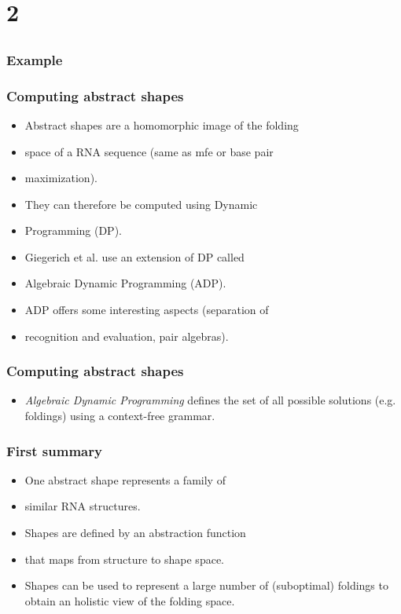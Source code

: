\documentclass[ignorenonframetext,10pt]{beamer}
\begin{document}
\section{2}
\subsection{}
\begin{frame}
\frametitle{Example }
\end{frame}

\begin{frame}
\frametitle{Computing abstract shapes}
   \begin{itemize} 
   \item Abstract shapes are a homomorphic image of the folding
   \item space of a RNA sequence (same as mfe or base pair 
   \item maximization).
   \item They can therefore be computed using Dynamic
   \item Programming (DP).  
   \item Giegerich et al. use an extension of DP called
   \item Algebraic Dynamic Programming (ADP).
   \item ADP offers some interesting aspects (separation of
   \item recognition and evaluation, pair algebras).
   \end{itemize}
\end{frame}

\begin{frame}
\frametitle{Computing abstract shapes}
   \begin{itemize} 
   \item  \emph{Algebraic Dynamic Programming} defines the set of all possible solutions (e.g. foldings) using a context-free grammar.
   \end{itemize}
\end{frame}

\begin{frame}
\frametitle{First summary  }
   \begin{itemize} 
   \item  One abstract shape represents a family of  
   \item     similar RNA structures.
   \item Shapes are defined by an abstraction function
   \item    that maps from structure to shape space.
   \item Shapes can be used to represent a large number of (suboptimal) foldings to obtain an holistic view of the folding space.
   \end{itemize}
\end{frame}
\end{document}
